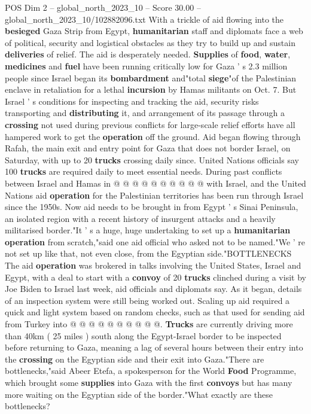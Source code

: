 \begin{textsample}{POS Dim 2 – global\_north\_2023\_10 – Score 30.00 – global\_north\_2023\_10/102882096.txt}  \label{ex:f2_pos_288}
With a trickle of aid flowing into the \textbf{besieged} Gaza Strip from Egypt, \textbf{humanitarian} staff and diplomats face a web of political, security and logistical obstacles as they try to build up and sustain \textbf{deliveries} of relief.
The aid is desperately needed. \textbf{Supplies} of \textbf{food}, \textbf{water}, \textbf{medicines} and \textbf{fuel} have been running critically low for Gaza ' s 2.3 million people since Israel began its \textbf{bombardment} and"total \textbf{siege}"of the Palestinian enclave in retaliation for a lethal \textbf{incursion} by Hamas militants on Oct. 7.
But Israel ' s conditions for inspecting and tracking the aid, security risks transporting and \textbf{distributing} it, and arrangement of its passage through a \textbf{crossing} not used during previous conflicts for large-scale relief efforts have all hampered work to get the \textbf{operation} off the ground.
Aid began flowing through Rafah, the main exit and entry point for Gaza that does not border Israel, on Saturday, with up to 20 \textbf{trucks} crossing daily since.
United Nations officials say 100 \textbf{trucks} are required daily to meet essential needs.
During past conflicts between Israel and Hamas in @ @ @ @ @ @ @ @ @ @ with Israel, and the United Nations aid \textbf{operation} for the Palestinian territories has been run through Israel since the 1950s.
Now aid needs to be brought in from Egypt ' s Sinai Peninsula, an isolated region with a recent history of insurgent attacks and a heavily militarised border."It ' s a huge, huge undertaking to set up a \textbf{humanitarian} \textbf{operation} from scratch,"said one aid official who asked not to be named."We ' re not set up like that, not even close, from the Egyptian side."BOTTLENECKS The aid \textbf{operation} was brokered in talks involving the United States, Israel and Egypt, with a deal to start with a \textbf{convoy} of 20 \textbf{trucks} clinched during a visit by Joe Biden to Israel last week, aid officials and diplomats say.
As it began, details of an inspection system were still being worked out.
Scaling up aid required a quick and light system based on random checks, such as that used for sending aid from Turkey into @ @ @ @ @ @ @ @ @ @. \textbf{Trucks} are currently driving more than 40km ( 25 miles ) south along the Egypt-Israel border to be inspected before returning to Gaza, meaning a lag of several hours between their entry into the \textbf{crossing} on the Egyptian side and their exit into Gaza."There are bottlenecks,"said Abeer Etefa, a spokesperson for the World \textbf{Food} Programme, which brought some \textbf{supplies} into Gaza with the first \textbf{convoys} but has many more waiting on the Egyptian side of the border."What exactly are these bottlenecks?

\end{textsample}
